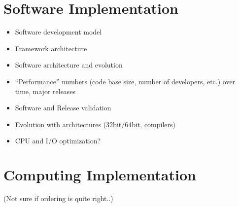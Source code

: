 \documentclass [draft,notitlepage] {article}
\begin{document}
\section{Software Implementation}
\begin{itemize}

\item Software development model

\item Framework architecture 

\item Software architecture and evolution

\item ``Performance'' numbers (code base size, number of developers, etc.) 
over time, major releases

\item Software and Release validation

\item Evolution with architectures (32bit/64bit, compilers)

\item CPU and I/O optimization?

\end{itemize}


\section{Computing Implementation} 
(Not sure if ordering is quite right..)

\end{document}
